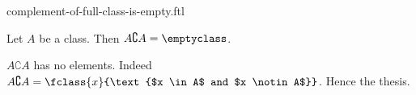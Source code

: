 \documentclass{article}
\begin{document}
\begin{smodule}[creators={Marcel Schütz}]{complement-of-full-class-is-empty.ftl}

  \begin{fproposition*}[label=7846433484963840]
    Let $A$ be a class.
    Then $A \complement A = \emptyclass$.
  \end{fproposition*}
  \begin{fproof}
    $A \complement A$ has no elements.
    Indeed $A \complement A = \fclass{x}{\text{$x \in A$ and $x \notin A$}}$.
    Hence the thesis.
  \end{fproof}
\end{smodule}
\end{document}
